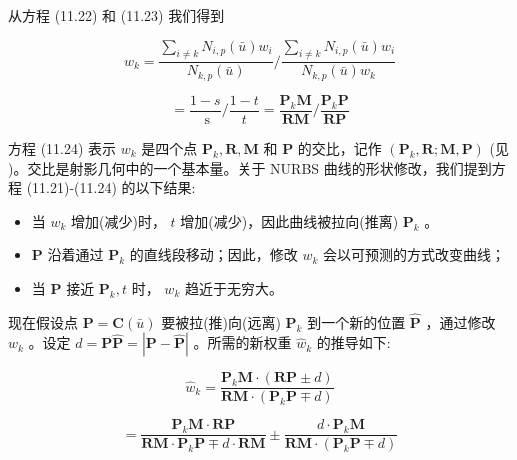\documentclass[../main.tex]{subfiles}
\begin{document}
从方程 (11.22) 和 (11.23) 我们得到

\[
{w}_{k} = \frac{\mathop{\sum }\limits_{{i \neq  k}}{N}_{i,p}\left( \bar{u}\right) {w}_{i}}{{N}_{k,p}\left( \bar{u}\right) }/\frac{\mathop{\sum }\limits_{{i \neq  k}}{N}_{i,p}\left( \bar{u}\right) {w}_{i}}{{N}_{k,p}\left( \bar{u}\right) {w}_{k}}
\]

\[
= \frac{1 - s}{\mathrm{\;s}}/\frac{1 - t}{t} = \frac{{\mathbf{P}}_{k}\mathbf{M}}{\mathbf{{RM}}}/\frac{{\mathbf{P}}_{k}\mathbf{P}}{\mathbf{{RP}}} \tag{11.24}
\]

方程 (11.24) 表示 \({w}_{k}\) 是四个点 \({\mathbf{P}}_{k},\mathbf{R},\mathbf{M}\) 和 \(\mathbf{P}\) 的交比，记作 \(\left( {{\mathbf{P}}_{k},\mathbf{R};\mathbf{M},\mathbf{P}}\right)\) (见 \cite{Coxe74,Boeh94})。交比是射影几何中的一个基本量。关于 NURBS 曲线的形状修改，我们提到方程 (11.21)-(11.24) 的以下结果:

\begin{itemize}
\item 当 \({w}_{k}\) 增加(减少)时， \(t\) 增加(减少)，因此曲线被拉向(推离) \({\mathbf{P}}_{k}\) 。
\end{itemize}

\begin{itemize}
\item \(\mathbf{P}\) 沿着通过 \({\mathbf{P}}_{k}\) 的直线段移动；因此，修改 \({w}_{k}\) 会以可预测的方式改变曲线；
\end{itemize}

\begin{itemize}
\item 当 \(\mathbf{P}\) 接近 \({\mathbf{P}}_{k},t\) 时， \({w}_{k}\) 趋近于无穷大。
\end{itemize}

现在假设点 \(\mathbf{P} = \mathbf{C}\left( \bar{u}\right)\) 要被拉(推)向(远离) \({\mathbf{P}}_{k}\) 到一个新的位置 \(\widehat{\mathbf{P}}\) ，通过修改 \({w}_{k}\) 。设定 \(d = \mathbf{P}\widehat{\mathbf{P}} = \left| {\mathbf{P} - \widehat{\mathbf{P}}}\right|\) 。所需的新权重 \({\widehat{w}}_{k}\) 的推导如下:

\[
{\widehat{w}}_{k} = \frac{{\mathbf{P}}_{k}\mathbf{M} \cdot  \left( {\mathbf{{RP}} \pm  d}\right) }{\mathbf{{RM}} \cdot  \left( {{\mathbf{P}}_{k}\mathbf{P} \mp  d}\right) }
\]

\[
= \frac{{\mathbf{P}}_{k}\mathbf{M} \cdot  \mathbf{{RP}}}{\mathbf{{RM}} \cdot  {\mathbf{P}}_{k}\mathbf{P} \mp  d \cdot  \mathbf{{RM}}} \pm  \frac{d \cdot  {\mathbf{P}}_{k}\mathbf{M}}{\mathbf{{RM}} \cdot  \left( {{\mathbf{P}}_{k}\mathbf{P} \mp  d}\right) }
\]
\end{document}
